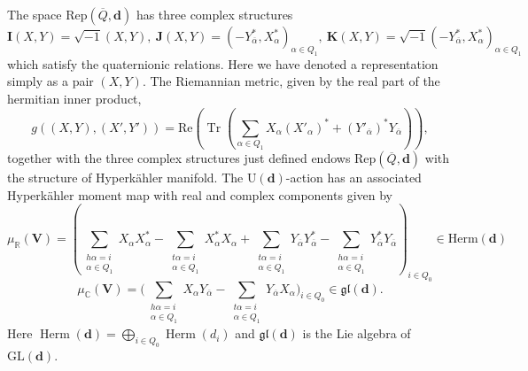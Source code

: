\documentclass{amsart}
\theoremstyle{plain}
\numberwithin{equation}{section}
\theoremstyle{definition}
\theoremstyle{remark}
\begin{document}
	The space $\text{Rep}(\overline{Q},\mathbf{d})$ has three complex structures 
	$$
	\mathbf{I}(X,Y)=\sqrt{-1}(X,Y),\ \mathbf{J}(X,Y)=(-Y_{\overline{\alpha}}^*,X_{\alpha}^*)_{\alpha\in Q_1},\ \mathbf{K}(X,Y)=\sqrt{-1}(-Y_{\overline{\alpha}}^*,X_{\alpha}^*)_{\alpha\in Q_1}
	$$
	which satisfy the quaternionic relations. Here we have denoted a representation simply as a pair $(X,Y)$. The Riemannian metric, given by the real part of the hermitian inner product,
	$$
	g((X,Y),(X',Y'))=\text{Re}(\operatorname{Tr}(\sum_{\alpha\in Q_1}X_\alpha (X'_\alpha)^*+(Y'_{\overline{\alpha}})^*Y_{\overline{\alpha}})),
	$$
	together with the three complex structures just defined endows $\text{Rep}(\overline{Q},\mathbf{d})$ with the structure of Hyperkähler manifold. The $\text{U}(\mathbf{d})$-action has an associated Hyperkähler moment map with real and complex components given by 
	\begin{equation}\label{realMomentMapDef}
		\mu_{\mathbb R}(\mathbf{V})
		=
		\left(
		\sum_{\substack{h\alpha=i\\ \alpha\in Q_1}} X_\alpha X_\alpha^*
		-
		\sum_{\substack{t\alpha=i\\ \alpha\in Q_1}} X_\alpha^*X_\alpha
		+
		\sum_{\substack{t\alpha=i\\ \alpha\in Q_1}} Y_{\overline{\alpha}} Y_{\overline{\alpha}}^*
		-
		\sum_{\substack{h\alpha=i\\ \alpha\in Q_1}} Y_{\overline{\alpha}}^*Y_{\overline{\alpha}}
		\right)_{i\in Q_0}\in \text{Herm}(\mathbf{d})
	\end{equation}
	\begin{equation}\label{complexMomentMapDef}
		\mu_{\mathbb{C}}(\mathbf{V})=\bigg(\sum_{\substack{h\alpha=i\\\alpha\in Q_1}}X_\alpha Y_{\overline{\alpha}}-\sum_{\substack{t\alpha=i\\\alpha\in Q_1}}Y_{\overline{\alpha}}X_\alpha\bigg)_{i\in Q_0}\in \mathfrak{gl}(\mathbf{d}).
	\end{equation}
	Here $\operatorname{Herm}(\mathbf{d})=\bigoplus_{i\in Q_0}\operatorname{Herm}(d_i)$ and $\mathfrak{gl}(\mathbf{d})$ is the Lie algebra of $\text{GL}(\mathbf{d})$. 
\end{document}
